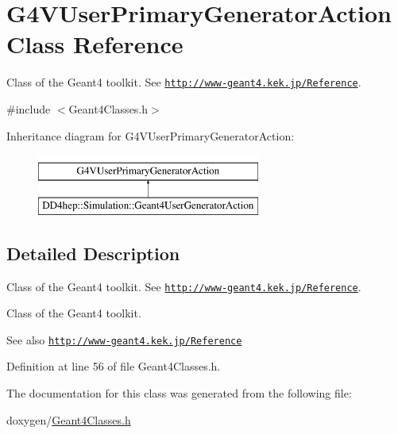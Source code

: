 \hypertarget{class_g4_v_user_primary_generator_action}{}\section{G4\+V\+User\+Primary\+Generator\+Action Class Reference}
\label{class_g4_v_user_primary_generator_action}


Class of the Geant4 toolkit. See \href{http://www-geant4.kek.jp/Reference}{\tt http\+://www-\/geant4.\+kek.\+jp/\+Reference}.  




{\ttfamily \#include $<$Geant4\+Classes.\+h$>$}

Inheritance diagram for G4\+V\+User\+Primary\+Generator\+Action\+:\begin{figure}[H]
\begin{center}
\leavevmode
\includegraphics[height=2.000000cm]{class_g4_v_user_primary_generator_action}
\end{center}
\end{figure}


\subsection{Detailed Description}
Class of the Geant4 toolkit. See \href{http://www-geant4.kek.jp/Reference}{\tt http\+://www-\/geant4.\+kek.\+jp/\+Reference}. 

Class of the Geant4 toolkit. \begin{DoxySeeAlso}{See also}
\href{http://www-geant4.kek.jp/Reference}{\tt http\+://www-\/geant4.\+kek.\+jp/\+Reference} 
\end{DoxySeeAlso}


Definition at line 56 of file Geant4\+Classes.\+h.



The documentation for this class was generated from the following file\+:\begin{DoxyCompactItemize}
\item 
doxygen/\hyperlink{_geant4_classes_8h}{Geant4\+Classes.\+h}\end{DoxyCompactItemize}
